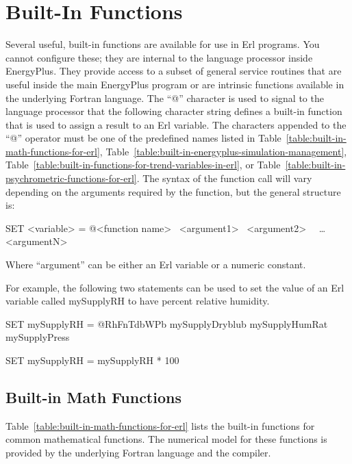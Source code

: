 \section{Built-In Functions}\label{built-in-functions}

Several useful, built-in functions are available for use in Erl programs. You cannot configure these; they are internal to the language processor inside EnergyPlus. They provide access to a subset of general service routines that are useful inside the main EnergyPlus program or are intrinsic functions available in the underlying Fortran language. The ``@'' character is used to signal to the language processor that the following character string defines a built-in function that is used to assign a result to an Erl variable. The characters appended to the ``@'' operator must be one of the predefined names listed in Table~\ref{table:built-in-math-functions-for-erl}, Table~\ref{table:built-in-energyplus-simulation-management}, Table~\ref{table:built-in-functions-for-trend-variables-in-erl}, or Table~\ref{table:built-in-psychrometric-functions-for-erl}. The syntax of the function call will vary depending on the arguments required by the function, but the general structure is:

SET \textless{}variable\textgreater{} = @\textless{}function name\textgreater{}~ \textless{}argument1\textgreater{}~ \textless{}argument2\textgreater{}~~ \ldots{}~~ \textless{}argumentN\textgreater{}

Where ``argument'' can be either an Erl variable or a numeric constant.

For example, the following two statements can be used to set the value of an Erl variable called mySupplyRH to have percent relative humidity.

SET mySupplyRH = @RhFnTdbWPb mySupplyDryblub mySupplyHumRat mySupplyPress

SET mySupplyRH = mySupplyRH * 100

\subsection{Built-in Math Functions}\label{built-in-math-functions}

Table~\ref{table:built-in-math-functions-for-erl} lists the built-in functions for common mathematical functions. The numerical model for these functions is provided by the underlying Fortran language and the compiler.

